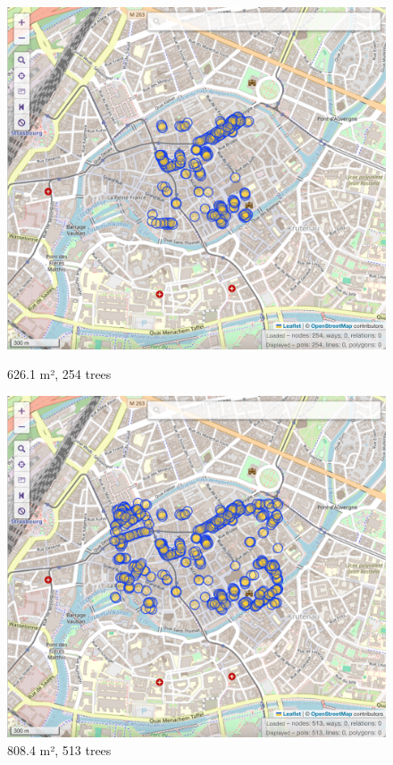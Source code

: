 \documentclass[12pt]{article}
\begin{document}
\begin{figure}[H]
    \centering
    \begin{minipage}{0.45\textwidth}
        \centering
        \includegraphics[width=\textwidth]{images/bbox3.png}
        \caption{626.1 m², 254 trees}
    \end{minipage}\hfill
    \begin{minipage}{0.45\textwidth}
        \centering
        \includegraphics[width=\textwidth]{images/bbox4.png}
        \caption{808.4 m², 513 trees}
    \end{minipage}
\end{figure}
\end{document}
